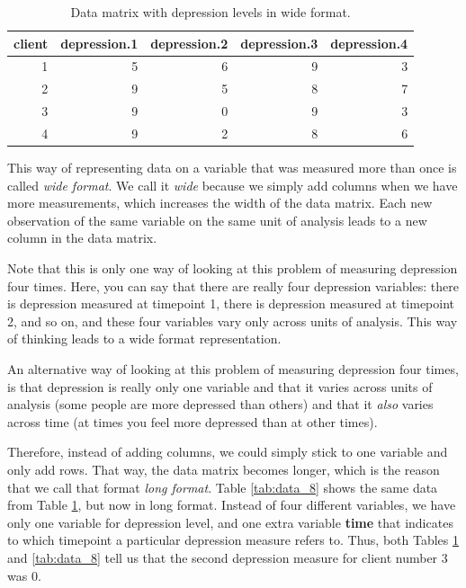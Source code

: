 \documentclass[]{report}\usepackage[]{graphicx}\usepackage[]{color}
\begin{document}
\begin{table}[ht]
\centering
\caption{Data matrix with depression levels in wide format.} 
\label{tab:data_7}
\begin{tabular}{rrrrr}
  \hline
client & depression.1 & depression.2 & depression.3 & depression.4 \\ 
  \hline
1 & 5 & 6 & 9 & 3 \\ 
  2 & 9 & 5 & 8 & 7 \\ 
  3 & 9 & 0 & 9 & 3 \\ 
  4 & 9 & 2 & 8 & 6 \\ 
   \hline
\end{tabular}
\end{table}


This way of representing data on a variable that was measured more than once is called \textit{wide format}. We call it \textit{wide} because we simply add columns when we have more measurements, which increases the width of the data matrix. Each new observation of the same variable on the same unit of analysis leads to a new column in the data matrix.

Note that this is only one way of looking at this problem of measuring depression four times. Here, you can say that there are really four depression variables: there is depression measured at timepoint 1, there is depression measured at timepoint 2, and so on, and these four variables vary only across units of analysis. This way of thinking leads to a wide format representation.

An alternative way of looking at this problem of measuring depression four times, is that depression is really only one variable and that it varies across units of analysis (some people are more depressed than others) and that it \textit{also} varies across time (at times you feel more depressed than at other times).

Therefore, instead of adding columns, we could simply stick to one variable and only add rows. That way, the data matrix becomes longer, which is the reason that we call that format \textit{long format}. Table \ref{tab:data_8} shows the same data from Table \ref{tab:data_7}, but now in long format. Instead of four different variables, we have only one variable for depression level, and one extra variable \textbf{time} that indicates to which timepoint a particular depression measure refers to. Thus, both Tables \ref{tab:data_7} and \ref{tab:data_8} tell us that the second depression measure for client number 3 was 0.
\end{document}
